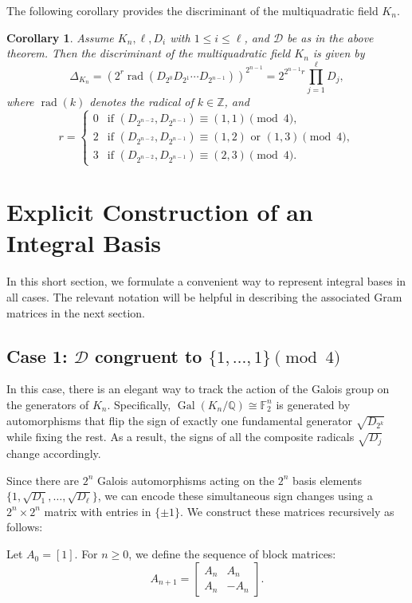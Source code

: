 \documentclass{amsart}
\newcommand{\Q}{\mathbb{Q}}
\newcommand{\F}{\mathbb{F}}
\newcommand{\op}[1]{\operatorname{#1}}
\newcommand{\Z}{\mathbb{Z}}
\theoremstyle{plain}
\newtheorem{corollary}[theorem]{Corollary}
\theoremstyle{definition}
\theoremstyle{remark}
\numberwithin{equation}{section}
\begin{document}
The following corollary provides the discriminant of the multiquadratic field $K_n$.
\begin{corollary}\cite[Corollary 2.2]{Man}\label{disc corollary Man}
    Assume $K_n, \ell, D_i$ with $1\leq i\leq \ell$, and $\mathcal{D}$ be as in the above theorem. Then the discriminant of the multiquadratic field $K_n$ is given by 
    $$ \Delta_{K_n} = (2^r \op{rad}(D_{2^0}D_{2^1}\cdots D_{2^{n-1}}))^{2^{n-1}} = 2^{2^{n-1}r}\prod\limits_{j=1}^{\ell}D_{j},  $$
    where $\op{rad}(k)$ denotes the radical of $k \in \Z$, and 
    \[
    r =
\begin{cases}
0 & \text{if } (D_{2^{n-2}}, D_{2^{n-1}}) \equiv (1,1) \pmod{4}, \\[6pt]
2 & \text{if } (D_{2^{n-2}}, D_{2^{n-1}}) \equiv (1,2) \text{ or } (1,3) \pmod{4}, \\[6pt]
3 & \text{if } (D_{2^{n-2}}, D_{2^{n-1}}) \equiv (2,3) \pmod{4}.
\end{cases}
    \]
\end{corollary}
\section{Explicit Construction of an Integral Basis}
\par In this short section, we formulate a convenient way to represent integral bases in all cases. The relevant notation will be helpful in describing the associated Gram matrices in the next section. 
\subsection*{Case 1: \texorpdfstring{$\mathcal{D}$ congruent to $\{1, \ldots, 1\} \pmod 4$}{Case 1}}
 In this case, there is an elegant way to track the action of the Galois group on the generators of $K_n$. Specifically, $\operatorname{Gal}(K_n/\Q) \cong \F_2^n$ is generated by automorphisms that flip the sign of exactly one fundamental generator $\sqrt{D_{2^k}}$ while fixing the rest. As a result, the signs of all the composite radicals $\sqrt{D_j}$ change accordingly.

Since there are $2^n$ Galois automorphisms acting on the $2^n$ basis elements $\{1, \sqrt{D_1}, \ldots, \sqrt{D_{\ell}}\}$, we can encode these simultaneous sign changes using a $2^n \times 2^n$ matrix with entries in $\{\pm 1\}$. We construct these matrices recursively as follows:

Let $A_0 = [1]$. For $n \ge 0$, we define the sequence of block matrices:
\[ 
    A_{n+1} = \begin{bmatrix}
        A_n & A_n \\
        A_n & -A_n
    \end{bmatrix}. 
\]
\end{document}
